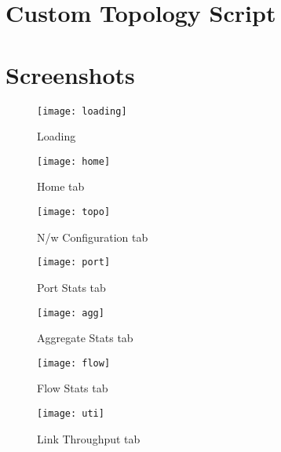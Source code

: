 \documentclass[11pt,a4paper]{report}
\begin{document}
\pagebreak
{}


\begin{appendices}
	\chapter{Custom Topology Script}
	\label{script}
	
	\chapter{Screenshots}
		\label{screenshots}
			\begin{figure}[!htbp]
				\centering
				\texttt{[image: loading]}
				\caption[]{Loading}
			\end{figure}
		\begin{figure}[!htbp]
			\centering
			\texttt{[image: home]}
			\caption[]{Home tab}
		\end{figure}
		
		\begin{sidewaysfigure}[!htbp]
			\centering
			\texttt{[image: topo]}
			\caption[]{N/w Configuration tab}
		\end{sidewaysfigure}

		\begin{sidewaysfigure}[!htbp]
			\centering
			\texttt{[image: port]}
			\caption[]{Port Stats tab}
		\end{sidewaysfigure}

		\begin{sidewaysfigure}[!htbp]
			\centering
			\texttt{[image: agg]}
			\caption[]{Aggregate Stats tab}
		\end{sidewaysfigure}
		
		\begin{sidewaysfigure}[!htbp]
			\centering
			\texttt{[image: flow]}
			\caption[]{Flow Stats tab}
		\end{sidewaysfigure}

		\begin{sidewaysfigure}[!htbp]
			\centering
			\texttt{[image: uti]}
			\caption[]{Link Throughput tab}
		\end{sidewaysfigure}
\end{appendices}
\end{document}
